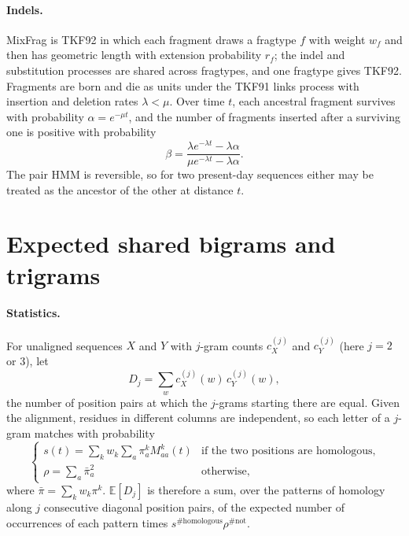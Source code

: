 \documentclass[11pt]{article}
\newcommand{\E}{\mathbb E}
\begin{document}
\paragraph{Indels.} MixFrag is TKF92 in which each fragment draws a fragtype
$f$ with weight $w_f$ and then has geometric length with extension
probability $r_f$; the indel and substitution processes are shared across
fragtypes, and one fragtype gives TKF92. Fragments are born and die as units
under the TKF91 links process \citep{ThorneKishinoFelsenstein1991} with
insertion and deletion rates $\lambda<\mu$. Over time $t$, each ancestral
fragment survives with probability $\alpha=e^{-\mu t}$, and the number of
fragments inserted after a surviving one is positive with probability
\[
\beta=\frac{\lambda e^{-\lambda t}-\lambda\alpha}{\mu e^{-\lambda t}-\lambda\alpha}.
\]
The pair HMM is reversible, so for two present-day sequences either may be
treated as the ancestor of the other at distance $t$.

\section{Expected shared bigrams and trigrams}

\paragraph{Statistics.} For unaligned sequences $X$ and $Y$ with $j$-gram
counts $c^{(j)}_X$ and $c^{(j)}_Y$ (here $j=2$ or $3$), let
\[
D_j=\sum_wc^{(j)}_X(w)\,c^{(j)}_Y(w),
\]
the number of position pairs at which the $j$-grams starting there are
equal. Given the
alignment, residues in different columns are independent, so each letter of a
$j$-gram matches with probability
\[
\begin{cases}
s(t)=\sum_kw_k\sum_a\pi^k_aM^k_{aa}(t)&\text{if the two positions are homologous,}\\
\rho=\sum_a\bar\pi_a^2&\text{otherwise,}
\end{cases}
\]
where $\bar\pi=\sum_kw_k\pi^k$. $\E[D_j]$ is therefore a sum, over the
patterns of homology along $j$ consecutive diagonal position pairs, of the
expected number of occurrences of each pattern times
$s^{\#\text{homologous}}\rho^{\#\text{not}}$.
\end{document}
